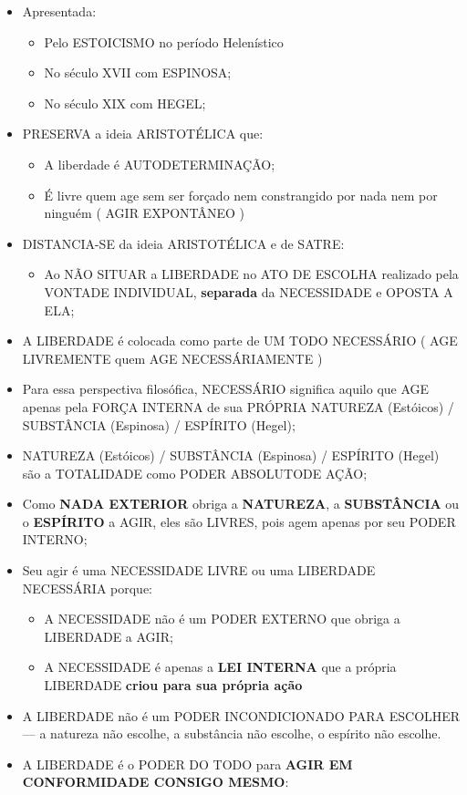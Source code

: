 \documentclass[
]{book}
\providecommand{\tightlist}{%
  \setlength{\itemsep}{0pt}\setlength{\parskip}{0pt}}
\begin{document}
\begin{itemize}
\tightlist
\item
  Apresentada:

  \begin{itemize}
  \tightlist
  \item
    Pelo ESTOICISMO no período Helenístico
  \item
    No século XVII com ESPINOSA;
  \item
    No século XIX com HEGEL;
  \end{itemize}
\item
  PRESERVA a ideia ARISTOTÉLICA que:

  \begin{itemize}
  \tightlist
  \item
    A liberdade é AUTODETERMINAÇÃO;
  \item
    É livre quem age sem ser forçado nem constrangido por nada nem por ninguém ( AGIR EXPONTÂNEO )
  \end{itemize}
\item
  DISTANCIA-SE da ideia ARISTOTÉLICA e de SATRE:

  \begin{itemize}
  \tightlist
  \item
    Ao NÃO SITUAR a LIBERDADE no ATO DE ESCOLHA realizado pela VONTADE INDIVIDUAL, \textbf{separada} da NECESSIDADE e OPOSTA A ELA;
  \end{itemize}
\item
  A LIBERDADE é colocada como parte de UM TODO NECESSÁRIO ( AGE LIVREMENTE quem AGE NECESSÁRIAMENTE )
\item
  Para essa perspectiva filosófica, NECESSÁRIO significa aquilo que AGE apenas pela FORÇA INTERNA de sua PRÓPRIA NATUREZA (Estóicos) / SUBSTÂNCIA (Espinosa) / ESPÍRITO (Hegel);
\item
  NATUREZA (Estóicos) / SUBSTÂNCIA (Espinosa) / ESPÍRITO (Hegel) são a TOTALIDADE como PODER ABSOLUTODE AÇÃO;
\item
  Como \textbf{NADA EXTERIOR} obriga a \textbf{NATUREZA}, a \textbf{SUBSTÂNCIA} ou o \textbf{ESPÍRITO} a AGIR, eles são LIVRES, pois agem apenas por seu PODER INTERNO;
\item
  Seu agir é uma NECESSIDADE LIVRE ou uma LIBERDADE NECESSÁRIA porque:

  \begin{itemize}
  \tightlist
  \item
    A NECESSIDADE não é um PODER EXTERNO que obriga a LIBERDADE a AGIR;
  \item
    A NECESSIDADE é apenas a \textbf{LEI INTERNA} que a própria LIBERDADE \textbf{criou para sua própria ação}
  \end{itemize}
\item
  A LIBERDADE não é um PODER INCONDICIONADO PARA ESCOLHER --- a natureza não escolhe, a substância não escolhe, o espírito não escolhe.
\item
  A LIBERDADE é o PODER DO TODO para \textbf{AGIR EM CONFORMIDADE CONSIGO MESMO}:


\end{itemize}
\end{document}

